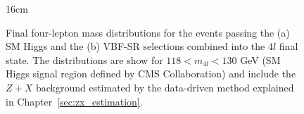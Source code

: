 \begin{figure}[hbtp]{16cm}
	\caption{Final four-lepton mass distributions for the events passing the (a) SM Higgs and the (b) VBF-SR selections combined into the $4l$ final state. The distributions are show for $118 < m_{4l} < 130$ GeV (SM Higgs signal region defined by CMS Collaboration) and include the $Z+X$ background estimated by the data-driven method explained in Chapter~\ref{sec:zx_estimation}.}
	\centering
	\label{fig:vbf_m4l_distribution}
\end{figure}


